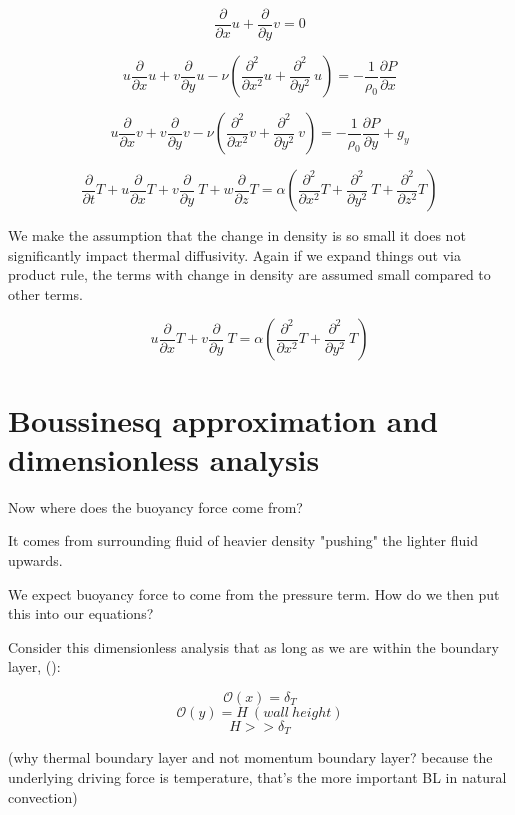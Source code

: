 \documentclass[11pt]{article}
\begin{document}
$$  \frac{\partial}{\partial x} u +  \frac{\partial}{\partial y} v  = 0$$

$$ u \frac{\partial}{\partial x} u + v \frac{\partial}{\partial y} u  - \nu ( \frac{\partial^2}{\partial x^2} u + \frac{\partial^2}{\partial y^2} \ u ) = - \frac{1}{\rho_0} \frac{\partial P}{\partial x} $$

$$ u \frac{\partial}{\partial x} v + v \frac{\partial}{\partial y} v  - \nu ( \frac{\partial^2}{\partial x^2} v + \frac{\partial^2}{\partial y^2} \ v ) = - \frac{1}{\rho_0} \frac{\partial P}{\partial y} +g_y$$


$$\frac{\partial }{\partial t} T + u \frac{\partial}{\partial x} T + v \frac{\partial }{\partial y} \ T + w \frac{\partial }{\partial z} T  = \alpha ( \frac{\partial^2}{\partial x^2} T +  \frac{\partial^2 }{\partial y^2} \ T +  \frac{\partial^2 }{\partial z^2} T) $$ 

We make the assumption that the change in density is so small it does not significantly impact thermal diffusivity. Again if we expand things out via product rule, the terms with change in density are assumed small compared to other terms.

$$ u \frac{\partial}{\partial x} T + v \frac{\partial }{\partial y} \ T = \alpha ( \frac{\partial^2}{\partial x^2} T +  \frac{\partial^2 }{\partial y^2} \ T ) $$ 

\section{Boussinesq approximation and dimensionless analysis}
Now where does the buoyancy force come from?


It comes from surrounding fluid of heavier density "pushing" the lighter fluid upwards.

We expect buoyancy force to come from the pressure term. How do we then put this into our equations?

Consider this dimensionless analysis that as long as we are within the boundary layer, (\cite{bejan2013convection}):

$$\mathcal{O}(x) = \delta_T$$
$$\mathcal{O}(y) = H \ (wall\ height)$$
$$H >> \delta_T$$


(why thermal boundary layer and not momentum boundary layer? because the underlying driving force is temperature, that's the more important BL in natural convection)
\end{document}
